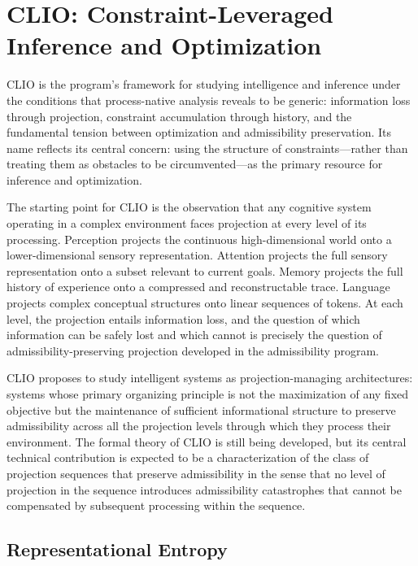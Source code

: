 \documentclass[11pt, oneside]{book}
\theoremstyle{definition}
\theoremstyle{remark}
\begin{document}
\section{CLIO: Constraint-Leveraged Inference and Optimization}

CLIO is the program's framework for studying intelligence and inference under the conditions that process-native analysis reveals to be generic: information loss through projection, constraint accumulation through history, and the fundamental tension between optimization and admissibility preservation. Its name reflects its central concern: using the structure of constraints—rather than treating them as obstacles to be circumvented—as the primary resource for inference and optimization.

The starting point for CLIO is the observation that any cognitive system operating in a complex environment faces projection at every level of its processing. Perception projects the continuous high-dimensional world onto a lower-dimensional sensory representation. Attention projects the full sensory representation onto a subset relevant to current goals. Memory projects the full history of experience onto a compressed and reconstructable trace. Language projects complex conceptual structures onto linear sequences of tokens. At each level, the projection entails information loss, and the question of which information can be safely lost and which cannot is precisely the question of admissibility-preserving projection developed in the admissibility program.

CLIO proposes to study intelligent systems as projection-managing architectures: systems whose primary organizing principle is not the maximization of any fixed objective but the maintenance of sufficient informational structure to preserve admissibility across all the projection levels through which they process their environment. The formal theory of CLIO is still being developed, but its central technical contribution is expected to be a characterization of the class of projection sequences that preserve admissibility in the sense that no level of projection in the sequence introduces admissibility catastrophes that cannot be compensated by subsequent processing within the sequence.

\subsection{Representational Entropy}
\end{document}
